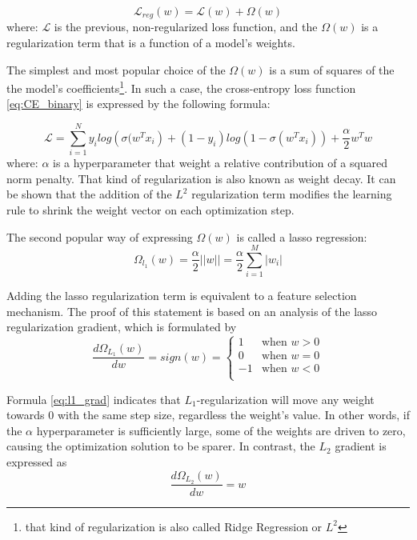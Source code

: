 \begin{equation}
    \mathcal{L}_{reg}(w) = \mathcal{L}(w) + \Omega(w) 
\end{equation}
where: $\mathcal{L}$ is the previous, non-regularized loss function, and the $\Omega(w)$ is a regularization term that is a function of a model's weights. 

The simplest and most popular choice of the $\Omega(w)$ is a sum of squares of the the model's coefficients\footnote{that kind of regularization is also called Ridge Regression or $L^2$}. In such a case, the cross-entropy loss function \ref{eq:CE_binary} is expressed by the following formula:

\begin{equation}
    \mathcal{L} =  \sum_{i=1}^{N}y_{i}log\left( \sigma(w^{T}x_{i}\right)+(1-y_i)log(1-\sigma(w^{T}x_{i})) + \frac{\alpha}{2} w^{T}w
\end{equation}
where: $\alpha$ is a hyperparameter that weight a relative contribution of a squared norm penalty. 
That kind of regularization is also known as weight decay. It can be shown  that the addition of the $L^2$  regularization term modifies the learning rule to shrink the weight vector on each optimization step. 

The second popular way of expressing $\Omega(w)$ is called a lasso regression:
\begin{equation}
\label{eq:lasso}
    \Omega_{l_1}(w) = \frac{\alpha}{2} ||w|| = \frac{\alpha}{2} \sum_{i=1}^{M} |w_i|
\end{equation}

 Adding the lasso regularization term is equivalent to a feature selection mechanism. The proof of this statement is based on an analysis of the lasso regularization gradient, which is formulated by 
\begin{equation}
\label{eq:l1_grad}
    \frac{d \Omega_{L_1}(w)}{dw} = sign(w) = \left\{ \begin{array}{ll}
1 & \textrm{when } w > 0\\
0 & \textrm{when } w = 0 \\
-1 & \textrm{when } w < 0 \\
\end{array} \right.
\end{equation}

Formula \ref{eq:l1_grad} indicates that $L_1$-regularization will move any weight towards 0 with the same step size, regardless the weight's value. In other words, if the $\alpha$ hyperparameter is sufficiently large, some of the weights are driven to zero, causing the optimization solution to be sparer. In contrast, the $L_2$ gradient is expressed as 
\begin{equation}
     \frac{d \Omega_{L_2}(w)}{dw} = w
     \label{eq:l2_grad}
\end{equation}


